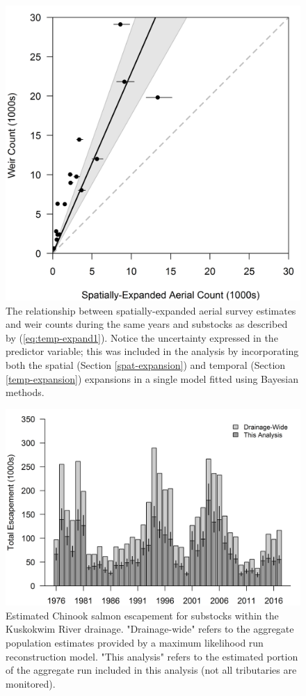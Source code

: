 \documentclass[12pt,]{book}
\theoremstyle{definition}
\theoremstyle{definition}
\theoremstyle{definition}
\theoremstyle{remark}
\begin{document}
\begin{figure}
  \centering
  \includegraphics{img/Ch4/obs-correct.png}
  \caption{The relationship between spatially-expanded aerial survey estimates and weir counts during the same years and substocks as described by (\ref{eq:temp-expand1}). Notice the uncertainty expressed in the predictor variable; this was included in the analysis by incorporating both the spatial (Section \ref{spat-expansion}) and temporal (Section \ref{temp-expansion}) expansions in a single model fitted using Bayesian methods.}
  \label{fig:obs-correct}
\end{figure}

\clearpage

\begin{figure}
  \centering
  \includegraphics{img/Ch4/obs-fraction.png}
  \caption{Estimated Chinook salmon escapement for substocks within the Kuskokwim River drainage. "Drainage-wide" refers to the aggregate population estimates provided by a maximum likelihood run reconstruction model. "This analysis" refers to the estimated portion of the aggregate run included in this analysis (not all tributaries are monitored).}
  \label{fig:obs-fraction}
\end{figure}

\doublespacing

\setlength{\parskip}{6pt plus 2pt minus 1pt}


\end{document}

